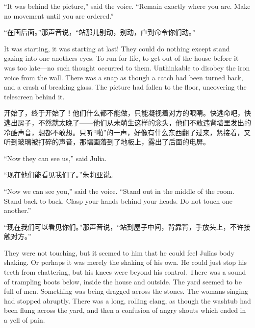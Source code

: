 \begin{paracol}{2}
``It was behind the picture,'' said the voice. ``Remain exactly where you
are. Make no movement until you are ordered.''

\switchcolumn

``在画后面。''那声音说，``站那儿别动，别动，直到命令你们动。''

\switchcolumn*

It was starting, it was starting at last! They could do nothing except
stand gazing into one another\textquotesingle s eyes. To run for life,
to get out of the house before it was too late---no such thought
occurred to them. Unthinkable to disobey the iron voice from the wall.
There was a snap as though a catch had been turned back, and a crash of
breaking glass. The picture had fallen to the floor, uncovering the
telescreen behind it.

\switchcolumn

开始了，终于开始了！他们什么都不能做，只能凝视着对方的眼睛。快逃命吧，快逃出房子，不然就太晚了——他们从未萌生这样的念头，他们不敢违背墙里发出的冷酷声音，想都不敢想。只听``啪''的一声，好像有什么东西翻了过来，紧接着，又听到玻璃被打碎的声音，那幅画落到了地板上，露出了后面的电屏。

\switchcolumn*

``Now they can see us,'' said Julia.

\switchcolumn

``现在他们能看见我们了。''朱莉亚说。

\switchcolumn*

``Now we can see you,'' said the voice. ``Stand out in the middle of the
room. Stand back to back. Clasp your hands behind your heads. Do not
touch one another.''

\switchcolumn

``现在我们可以看见你们。''那声音说，``站到屋子中间，背靠背，手放头上，不许接触对方。''

\switchcolumn*

They were not touching, but it seemed to him that he could feel
Julia\textquotesingle s body shaking. Or perhaps it was merely the
shaking of his own. He could just stop his teeth from chattering, but
his knees were beyond his control. There was a sound of trampling boots
below, inside the house and outside. The yard seemed to be full of men.
Something was being dragged across the stones. The
woman\textquotesingle s singing had stopped abruptly. There was a long,
rolling clang, as though the washtub had been flung across the yard, and
then a confusion of angry shouts which ended in a yell of pain.


\end{paracol}
